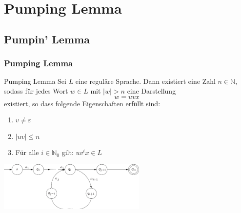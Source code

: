 \section{Pumping Lemma}
\subsection{Pumpin' Lemma}
\begin{frame}
\frametitle{Pumping Lemma}
\begin{exampleblock}{Pumping Lemma}
Sei $L$ eine reguläre Sprache. Dann existiert eine Zahl $n \in \mathbb{N}$, sodass für jedes Wort $w \in L$ mit $\left|w \right| > n$ eine Darstellung $$w = uvx$$ existiert, so dass folgende Eigenschaften erfüllt sind:

\begin{enumerate}
\item $v \neq \varepsilon$ 
\item $\left|uv\right| \leq n$ 
\item Für alle $i \in \mathbb{N}_0$ gilt: $uv^ix \in L$
\end{enumerate}
\end{exampleblock}

\begin{center}
\includegraphics[width=0.55\textwidth]{images/Q116}
\end{center}

\end{frame}

